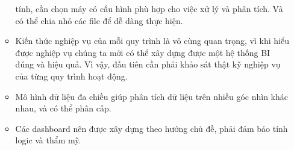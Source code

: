 \begin{enumerate}
\begin{itemize}[label=$-$]
tính, cần chọn máy có cấu hình phù hợp cho việc xử lý và phân tích.
Và có thể chia nhỏ các file để dễ dàng thực hiện.
\item  Kiến thức nghiệp vụ của mỗi quy trình là vô cùng quan trọng, vì khi
hiểu được nghiệp vụ chúng ta mới có thể xây dựng được một hệ thống
BI đúng và hiệu quả. Vì vậy, đầu tiên cần phải khảo sát thật kỹ nghiệp
vụ của từng quy trình hoạt động.
\item  Mô hình dữ liệu đa chiều giúp phân tích dữ liệu trên nhiều góc nhìn
khác nhau, và có thể phân cấp.
\item Các dashboard nên được xây dựng theo hướng chủ đề, phải đảm bảo
tính logic và thẩm mỹ.
\end{itemize}
   
\end{enumerate}
\newpage
\newpage
\listoffigures

